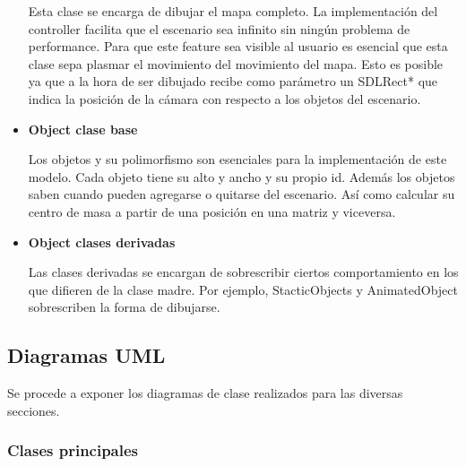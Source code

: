 \documentclass[a4paper]{article}
\begin{document}
\begin{itemize}
Esta clase se encarga de dibujar el mapa completo. La implementación del controller facilita que el escenario sea infinito sin ningún problema de performance. Para que este feature sea visible al usuario es esencial que esta clase sepa plasmar el movimiento del movimiento del mapa. Esto es posible ya que a la hora de ser dibujado recibe como parámetro un SDLRect* que indica la posición de la cámara con respecto a los objetos del escenario.

\item \textbf{Object clase base}

Los objetos y su polimorfismo son esenciales para la implementación de este modelo. Cada objeto tiene su alto y ancho y su propio id. Además los objetos saben cuando pueden agregarse o quitarse del escenario. Así como calcular su centro de masa a partir de una posición en una matriz y viceversa.

\item \textbf{Object clases derivadas}

Las clases derivadas se encargan de sobrescribir ciertos comportamiento en los que difieren de la clase madre. Por ejemplo, StacticObjects y AnimatedObject sobrescriben la forma de dibujarse.

\end{itemize}

\subsection{Diagramas UML}
Se procede a exponer los diagramas de clase realizados para las diversas secciones.

\newpage

\subsubsection{Clases principales}
\end{document}
